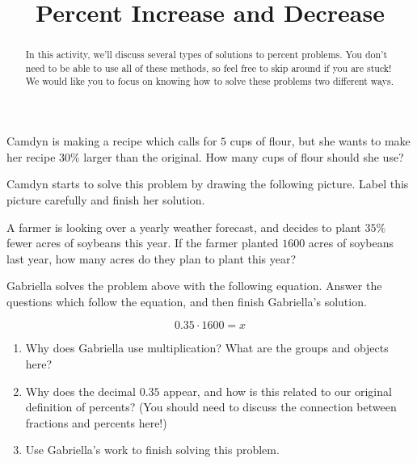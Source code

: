 \documentclass[noauthor,nooutcomes, handout]{ximera}
\title{Percent Increase and Decrease}
\begin{document}
\begin{abstract} In this activity, we'll discuss several types of solutions to percent problems. You don't need to be able to use all of these methods, so feel free to skip around if you are stuck! We would like you to focus on knowing how to solve these problems two different ways. \end{abstract}
\maketitle



\begin{problem}
Camdyn is making a recipe which calls for $5$ cups of flour, but she wants to make her recipe $30\%$ larger than the original. How many cups of flour should she use?

\vskip 0.1in
Camdyn starts to solve this problem by drawing the following picture. Label this picture carefully and finish her solution.
\begin{center}
\end{center}
\end{problem}



\begin{problem}
A farmer is looking over a yearly weather forecast, and decides to plant $35\%$ fewer acres of soybeans this year. If the farmer planted $1600$ acres of soybeans last year, how many acres do they plan to plant this year?

\vskip 0.1in

Gabriella solves the problem above with the following equation. Answer the questions which follow the equation, and then finish Gabriella's solution.

\[
0.35 \cdot 1600 = x
\]

\begin{enumerate}
	\item Why does Gabriella use multiplication? What are the groups and objects here?
	\item Why does the decimal $0.35$ appear, and how is this related to our original definition of percents? (You should need to discuss the connection between fractions and percents here!)
	\item Use Gabriella's work to finish solving this problem.
\end{enumerate}
\end{problem}
\end{document}
